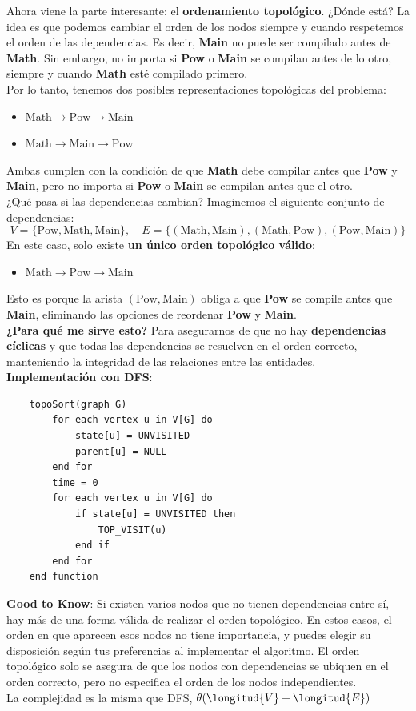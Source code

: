 \documentclass[10pt,a4paper]{article}
\begin{document}
Ahora viene la parte interesante: el \textbf{ordenamiento topológico}. ¿Dónde está? La idea es que podemos cambiar el orden de los nodos siempre y cuando respetemos el orden de las dependencias. Es decir, \textbf{Main} no puede ser compilado antes de \textbf{Math}. Sin embargo, no importa si \textbf{Pow} o \textbf{Main} se compilan antes de lo otro, siempre y cuando \textbf{Math} esté compilado primero. \\
Por lo tanto, tenemos dos posibles representaciones topológicas del problema:
\begin{itemize}
    \item $ \text{Math} \rightarrow \text{Pow} \rightarrow \text{Main} $
    \item $ \text{Math} \rightarrow \text{Main} \rightarrow \text{Pow} $
\end{itemize}
Ambas cumplen con la condición de que \textbf{Math} debe compilar antes que \textbf{Pow} y \textbf{Main}, pero no importa si \textbf{Pow} o \textbf{Main} se compilan antes que el otro. \\
¿Qué pasa si las dependencias cambian? Imaginemos el siguiente conjunto de dependencias:
\[
V = \{ \text{Pow}, \text{Math}, \text{Main} \}, \quad E = \{ (\text{Math}, \text{Main}), (\text{Math}, \text{Pow}), (\text{Pow}, \text{Main}) \}
\]
En este caso, solo existe \textbf{un único orden topológico válido}:
\begin{itemize}
    \item $ \text{Math} \rightarrow \text{Pow} \rightarrow \text{Main} $
\end{itemize}
Esto es porque la arista $(\text{Pow}, \text{Main})$ obliga a que \textbf{Pow} se compile antes que \textbf{Main}, eliminando las opciones de reordenar \textbf{Pow} y \textbf{Main}. \\
\textbf{¿Para qué me sirve esto?} Para asegurarnos de que no hay \textbf{dependencias cíclicas} y que todas las dependencias se resuelven en el orden correcto, manteniendo la integridad de las relaciones entre las entidades. \\
\textbf{Implementación con DFS}: 
\begin{lstlisting}
    topoSort(graph G)
        for each vertex u in V[G] do
            state[u] = UNVISITED
            parent[u] = NULL
        end for
        time = 0
        for each vertex u in V[G] do
            if state[u] = UNVISITED then
                TOP_VISIT(u)
            end if
        end for
    end function
\end{lstlisting}
\textbf{Good to Know}: Si existen varios nodos que no tienen dependencias entre sí, hay más de una forma válida de realizar el orden topológico. En estos casos, el orden en que aparecen esos nodos no tiene importancia, y puedes elegir su disposición según tus preferencias al implementar el algoritmo. El orden topológico solo se asegura de que los nodos con dependencias se ubiquen en el orden correcto, pero no especifica el orden de los nodos independientes. \\
La complejidad es la misma que DFS, $\theta(\longitud{V} + \longitud{E})$
\end{document}
